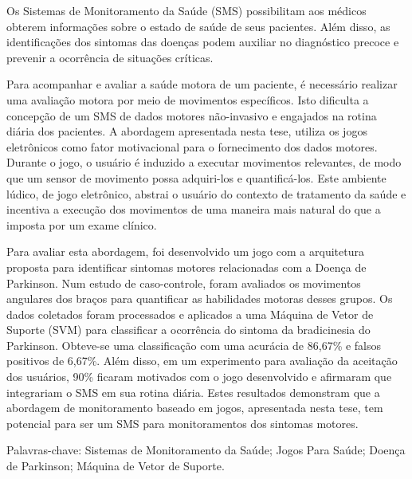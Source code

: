 Os Sistemas de Monitoramento da Saúde (SMS) possibilitam aos médicos obterem informações sobre o estado de saúde de seus pacientes. Além disso, as identificações dos sintomas das doenças podem auxiliar no diagnóstico precoce e prevenir a ocorrência de situações críticas.

Para acompanhar e avaliar a saúde motora de um paciente, é necessário realizar uma avaliação motora por meio de movimentos específicos. Isto dificulta a concepção de um SMS de dados motores não-invasivo e engajados na rotina diária dos pacientes. A abordagem apresentada nesta tese, utiliza os jogos eletrônicos como fator motivacional para o fornecimento dos dados motores. Durante o jogo, o usuário é induzido a executar movimentos relevantes, de modo que um sensor de movimento possa adquiri-los e quantificá-los. Este ambiente lúdico, de jogo eletrônico, abstrai o usuário do contexto de tratamento da saúde e incentiva a execução dos movimentos de uma maneira mais natural do que a imposta por um exame clínico.

Para avaliar esta abordagem, foi desenvolvido um jogo com a arquitetura proposta para identificar sintomas motores relacionadas com a Doença de Parkinson. Num estudo de caso-controle, foram avaliados 
os movimentos angulares dos braços ​​para quantificar as habilidades motoras desses grupos. Os dados coletados foram processados ​​e aplicados a uma Máquina de Vetor de Suporte (SVM) para classificar a ocorrência do sintoma da bradicinesia do Parkinson. Obteve-se uma classificação com uma acurácia de 86,67\% e falsos positivos de 6,67\%. Além disso, em um experimento para avaliação da aceitação dos usuários, 90\% ficaram motivados com o jogo desenvolvido e afirmaram que integrariam o SMS em sua rotina diária. Estes resultados demonstram que a abordagem de monitoramento baseado em jogos, apresentada nesta tese, tem potencial para ser um SMS para monitoramentos dos sintomas motores.

Palavras-chave: Sistemas de Monitoramento da Saúde; Jogos Para Saúde; Doença de Parkinson; Máquina de Vetor de Suporte.






